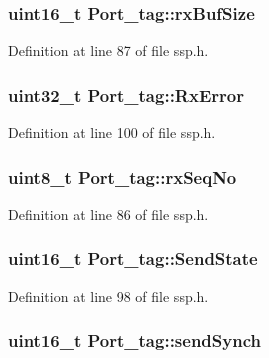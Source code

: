 \hypertarget{struct_port__tag_af09500b48a0a17a2ba95df22e44f0c06}{
\subsubsection[{rx\-Buf\-Size}]{\setlength{\rightskip}{0pt plus 5cm}uint16\-\_\-t Port\-\_\-tag\-::rx\-Buf\-Size}}\label{struct_port__tag_af09500b48a0a17a2ba95df22e44f0c06}


Definition at line 87 of file ssp.\-h.

\hypertarget{struct_port__tag_aa25c893c348af3cfda6367dbc2de7961}{
\subsubsection[{Rx\-Error}]{\setlength{\rightskip}{0pt plus 5cm}uint32\-\_\-t Port\-\_\-tag\-::\-Rx\-Error}}\label{struct_port__tag_aa25c893c348af3cfda6367dbc2de7961}


Definition at line 100 of file ssp.\-h.

\hypertarget{struct_port__tag_a7a1772d5a99a1f86dacd3f04c7416e92}{
\subsubsection[{rx\-Seq\-No}]{\setlength{\rightskip}{0pt plus 5cm}uint8\-\_\-t Port\-\_\-tag\-::rx\-Seq\-No}}\label{struct_port__tag_a7a1772d5a99a1f86dacd3f04c7416e92}


Definition at line 86 of file ssp.\-h.

\hypertarget{struct_port__tag_a2a4b6bca783da837f9e0c32a84e99788}{
\subsubsection[{Send\-State}]{\setlength{\rightskip}{0pt plus 5cm}uint16\-\_\-t Port\-\_\-tag\-::\-Send\-State}}\label{struct_port__tag_a2a4b6bca783da837f9e0c32a84e99788}


Definition at line 98 of file ssp.\-h.

\hypertarget{struct_port__tag_afb61302bc42bc58ea142b22b20374e85}{
\subsubsection[{send\-Synch}]{\setlength{\rightskip}{0pt plus 5cm}uint16\-\_\-t Port\-\_\-tag\-::send\-Synch}}\label{struct_port__tag_afb61302bc42bc58ea142b22b20374e85}


